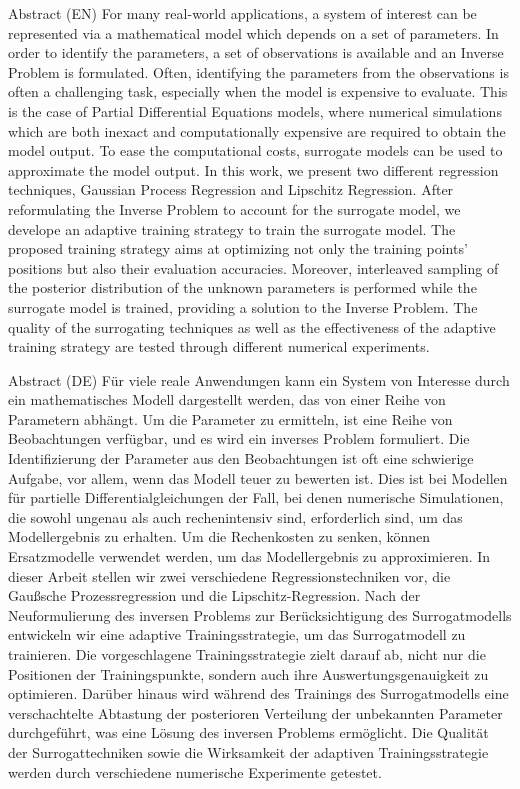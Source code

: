 \begin{abstractBox}[colbacktitle=black]{Abstract (EN)}{
    For many real-world applications, a system of interest can be represented via a mathematical model which depends on a set of parameters. 
    In order to identify the parameters, a set of observations is available and an Inverse Problem is formulated. 
    Often, identifying the parameters from the observations is often a challenging task, especially when the model is expensive to evaluate. 
    This is the case of Partial Differential Equations models, where numerical simulations which are both inexact and computationally expensive are required to obtain the model output. 
    To ease the computational costs, surrogate models can be used to approximate the model output. 
    In this work, we present two different regression techniques, Gaussian Process Regression and Lipschitz Regression. 
    After reformulating the Inverse Problem to account for the surrogate model, we develope an adaptive training strategy to train the surrogate model. 
    The proposed training strategy aims at optimizing not only the training points' positions but also their evaluation accuracies.
    Moreover, interleaved sampling of the posterior distribution of the unknown parameters is performed while the surrogate model is trained, providing a solution to the Inverse Problem.
    The quality of the surrogating techniques as well as the effectiveness of the adaptive training strategy are tested through different numerical experiments.
}
\end{abstractBox}
\begin{abstractBox}[colbacktitle=black]{Abstract (DE)}{
    Für viele reale Anwendungen kann ein System von Interesse durch ein mathematisches Modell dargestellt werden, das von einer Reihe von Parametern abhängt. 
    Um die Parameter zu ermitteln, ist eine Reihe von Beobachtungen verfügbar, und es wird ein inverses Problem formuliert. 
    Die Identifizierung der Parameter aus den Beobachtungen ist oft eine schwierige Aufgabe, vor allem, wenn das Modell teuer zu bewerten ist. 
    Dies ist bei Modellen für partielle Differentialgleichungen der Fall, bei denen numerische Simulationen, die sowohl ungenau als auch rechenintensiv sind, erforderlich sind, um das Modellergebnis zu erhalten. 
    Um die Rechenkosten zu senken, können Ersatzmodelle verwendet werden, um das Modellergebnis zu approximieren. 
    In dieser Arbeit stellen wir zwei verschiedene Regressionstechniken vor, die Gaußsche Prozessregression und die Lipschitz-Regression. 
    Nach der Neuformulierung des inversen Problems zur Berücksichtigung des Surrogatmodells entwickeln wir eine adaptive Trainingsstrategie, um das Surrogatmodell zu trainieren. 
    Die vorgeschlagene Trainingsstrategie zielt darauf ab, nicht nur die Positionen der Trainingspunkte, sondern auch ihre Auswertungsgenauigkeit zu optimieren.
    Darüber hinaus wird während des Trainings des Surrogatmodells eine verschachtelte Abtastung der posterioren Verteilung der unbekannten Parameter durchgeführt, was eine Lösung des inversen Problems ermöglicht.
    Die Qualität der Surrogattechniken sowie die Wirksamkeit der adaptiven Trainingsstrategie werden durch verschiedene numerische Experimente getestet.
    }
    \end{abstractBox}
\vspace{.5cm}